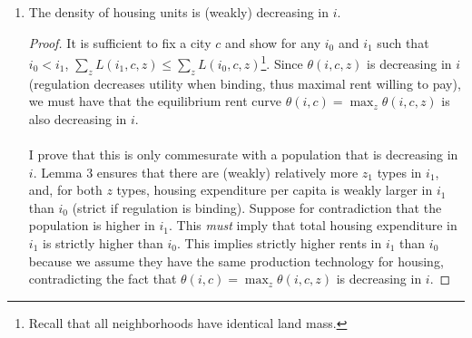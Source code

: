 \documentclass[12pt]{article}
\begin{document}
\begin{enumerate}
\begin{proof}
\begin{enumerate}
				\item $L(i_{0}, c_{1}, z_{1}) = 0, \; \text{or} \;  L(i_{0}, c_{1}, z_{0}) > 0$ 
			\end{enumerate}
			
			I prove this. a) $L(i, c_{1}, z_{1}) > 0$ and $L(i, c_{1}, z_{0}) = 0$ follows from the same argument in the proof of Statement 1. 
			\paragraph*{}
			
			It remains to show $b)$. Suppose, for contradiction, that $L(i_{0}, c_{1}, z_{1}) > 0$ and $L(i_{0}, c_{1}, z_{0}) = 0$; that is, high income types strictly outbid low income in the low regulation neighborhood of the productive city. Then $\theta(i_{0}, c_{1}, z_{1}) > \theta(i_{0}, c_{1}, z_{0})$. However, this immediately implies that $\theta(i_{0}, c, z_{1}) > \theta(i_{0}, c, z_{0})$ for every $c$ because $i_{0}$ neighborhoods are unregulated and thus the bid rents have the same slopes across income types (Lemma 2). However, this also then implies $\theta(i_{1}, c, z_{1}) > \theta(i_{1}, c, z_{0})$ for all $c$ because Lemma 3 ensures that the slope of the bid rent across neighborhoods is nondecreasing in $z$. Hence, $z_{0}$ types are outbid from all neighborhoods and cities, which cannot be an equilibrium. 
			
		\end{proof}
		
		
			
		\item  The density of housing units is (weakly) decreasing in $i$. 
		
		\begin{proof}
			It is sufficient to fix a city $c$ and show for any $i_{0}$ and $i_{1}$ such that $i_{0} < i_{1}$, $\sum_{z}L(i_{1}, c, z) \leq \sum_{z}L(i_{0}, c, z)$\footnote{Recall that all neighborhoods have identical land mass.}. Since $\theta(i, c, z)$ is decreasing in $i$ (regulation decreases utility when binding, thus maximal rent willing to pay), we must have that the equilibrium rent curve $\theta(i, c) = \max_{z}\theta(i, c, z)$ is also decreasing in $i$. 
			
			\paragraph*{} I prove that this is only commesurate with a population that is decreasing in $i$. Lemma 3 ensures that there are (weakly) relatively more $z_{1}$ types in $i_{1}$, and, for both $z$ types, housing expenditure per capita is weakly larger in $i_{1}$ than $i_{0}$ (strict if regulation is binding). Suppose for contradiction that the population is higher in $i_{1}$. This \textit{must} imply that total housing expenditure in $i_{1}$ is strictly higher than $i_{0}$. This implies strictly higher rents in $i_{1}$ than $i_{0}$ because we assume they have the same production technology for housing, contradicting the fact that  $\theta(i, c) = \max_{z}\theta(i, c, z)$ is decreasing in $i$. 
			

\end{proof}
\end{enumerate}
\end{document}
